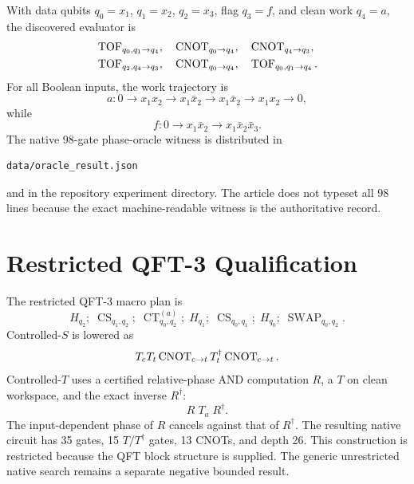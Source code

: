 With data qubits $q_0=x_1$, $q_1=x_2$, $q_2=x_3$, flag $q_3=f$, and clean work $q_4=a$, the discovered evaluator is
\begin{align}
&\operatorname{TOF}_{q_0,q_1\rightarrow q_4},
\quad \operatorname{CNOT}_{q_0\rightarrow q_4},
\quad \operatorname{CNOT}_{q_4\rightarrow q_3},\nonumber\\
&\operatorname{TOF}_{q_2,q_4\rightarrow q_3},
\quad \operatorname{CNOT}_{q_0\rightarrow q_4},
\quad \operatorname{TOF}_{q_0,q_1\rightarrow q_4}.
\end{align}
For all Boolean inputs, the work trajectory is
\begin{equation}
a:0\rightarrow x_1x_2\rightarrow x_1\bar x_2
\rightarrow x_1\bar x_2\rightarrow x_1x_2\rightarrow0,
\end{equation}
while
\begin{equation}
f:0\rightarrow x_1\bar x_2
\rightarrow x_1\bar x_2\bar x_3.
\end{equation}
The native 98-gate phase-oracle witness is distributed in
\begin{verbatim}
data/oracle_result.json
\end{verbatim}
and in the repository experiment directory.  The article does not typeset all 98 lines because the exact machine-readable witness is the authoritative record.

\section{Restricted QFT-3 Qualification}

The restricted QFT-3 macro plan is
\begin{equation}
H_{q_2};\;\operatorname{CS}_{q_1,q_2};\;
\operatorname{CT}^{(a)}_{q_0,q_2};\;H_{q_1};\;
\operatorname{CS}_{q_0,q_1};\;H_{q_0};\;
\operatorname{SWAP}_{q_0,q_2}.
\end{equation}
Controlled-$S$ is lowered as
\begin{equation}
T_cT_t\operatorname{CNOT}_{c\to t}T_t^\dagger\operatorname{CNOT}_{c\to t}.
\end{equation}
Controlled-$T$ uses a certified relative-phase AND computation $R$, a $T$ on clean workspace, and the exact inverse $R^\dagger$:
\begin{equation}
R\;T_a\;R^\dagger.
\end{equation}
The input-dependent phase of $R$ cancels against that of $R^\dagger$.  The resulting native circuit has 35 gates, 15 $T/T^\dagger$ gates, 13 CNOTs, and depth 26.  This construction is restricted because the QFT block structure is supplied.  The generic unrestricted native search remains a separate negative bounded result.

